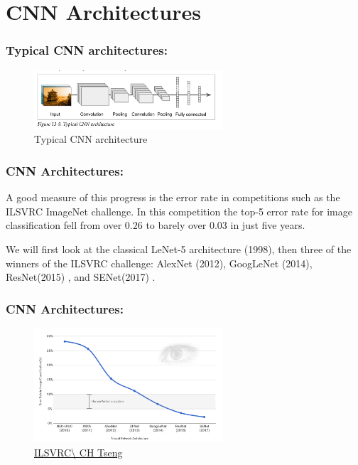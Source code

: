 \documentclass{beamer}
\begin{document}
\section{CNN Architectures}
    \begin{frame}
    \frametitle{Typical CNN architectures: }
        \begin{figure}[H]
            \begin{center}
                \includegraphics[width=7cm]{FIGURE13-9}
            \end{center}
        \caption{Typical CNN architecture}
        \end{figure}
    \end{frame}

    \begin{frame}
    \frametitle{CNN Architectures: }
        \par A good measure of this progress is the error rate in  competitions  such  as  the ILSVRC  ImageNet  challenge.
             In  this  competition  the top-5 error rate for image
             classification fell from over $0.26$ to barely over $0.03$ in just five years.
        \par We will first look at the classical LeNet-5 architecture (1998), then three of the winners
             of  the  ILSVRC  challenge:  AlexNet  (2012),  GoogLeNet  (2014),  ResNet(2015) , and SENet(2017) .
    \end{frame}

    \begin{frame}
    \frametitle{CNN Architectures: }
        \begin{figure}[H]
            \begin{center}
                \includegraphics[width=7cm]{FIGURE13-1}
            \end{center}
        \caption{{\href{https://read01.com/zh-tw/0kxzNk.html.W6D_hegzaUk}{\url{ILSVRC\ CH Tseng}}}}
        \end{figure}
    \end{frame}
\end{document}
